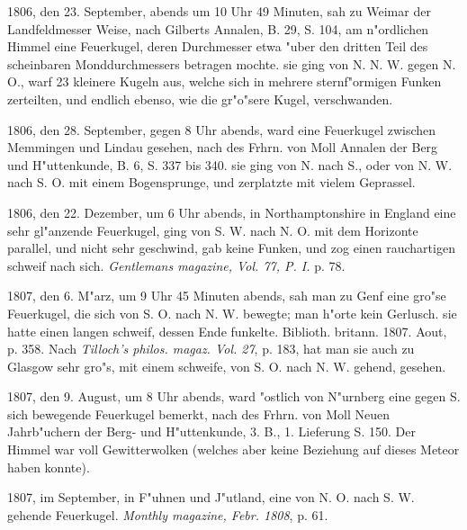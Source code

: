 \documentclass[a4paper, 11pt, oneside, polutonikogreek, german]{article}
\begin{document}
1806, den 23. September, abends um 10 Uhr 49 Minuten, sah zu Weimar der Landfeldmesser Weise, nach Gilberts Annalen, B. 29, S. 104, am n"ordlichen Himmel eine Feuerkugel, deren Durchmesser etwa "uber den dritten Teil des scheinbaren Monddurchmessers betragen mochte. sie ging von N. N. W. gegen N. O., warf 23 kleinere Kugeln aus, welche sich in mehrere sternf"ormigen Funken zerteilten, und endlich ebenso, wie die gr"o"sere Kugel, verschwanden.

1806, den 28. September, gegen 8 Uhr abends, ward eine Feuerkugel zwischen Memmingen und Lindau gesehen, nach des Frhrn. von Moll Annalen der Berg und H"uttenkunde, B. 6, S. 337 bis 340. sie ging von N. nach S., oder von N. W. nach S. O. mit einem Bogensprunge, und zerplatzte mit vielem Geprassel.

1806, den 22. Dezember, um 6 Uhr abends, in Northamptonshire in England eine sehr gl"anzende Feuerkugel, ging von S. W. nach N. O. mit dem Horizonte parallel, und nicht sehr geschwind, gab keine Funken, und zog einen rauchartigen schweif nach sich. \emph{Gentlemans magazine, Vol. 77, P. I.} p. 78.

1807, den 6. M"arz, um 9 Uhr 45 Minuten abends, sah man zu Genf eine gro"se Feuerkugel, die sich von S. O. nach N. W. bewegte; man h"orte kein Gerlusch. sie hatte einen langen schweif, dessen Ende funkelte. Biblioth. britann. 1807. Aout, p. 358. Nach \emph{Tilloch's philos. magaz. Vol. 27}, p. 183, hat man sie auch zu Glasgow sehr gro"s, mit einem schweife, von S. O. nach N. W. gehend, gesehen.

1807, den 9. August, um 8 Uhr abends, ward "ostlich von N"urnberg eine gegen S. sich bewegende Feuerkugel bemerkt, nach des Frhrn. von Moll Neuen Jahrb"uchern der Berg- und H"uttenkunde, 3. B., 1. Lieferung S. 150. Der Himmel war voll Gewitterwolken (welches aber keine Beziehung auf dieses Meteor haben konnte).

1807, im September, in F"uhnen und J"utland, eine von N. O. nach S. W. gehende Feuerkugel. \emph{Monthly magazine, Febr. 1808}, p. 61.
\end{document}
